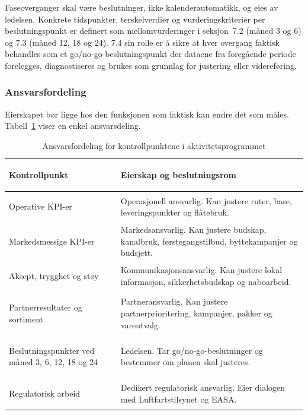 Faseoverganger skal være beslutninger, ikke kalenderautomatikk, og eies
av ledelsen. Konkrete tidspunkter, terskelverdier og vurderingskriterier
per beslutningspunkt er definert som mellomvurderinger i
seksjon~7.2 (måned 3 og 6) og 7.3 (måned 12, 18 og 24). 7.4 sin rolle er
å sikre at hver overgang faktisk behandles som et go/no-go-beslutningspunkt
der dataene fra foregående periode forelegges, diagnostiseres og brukes
som grunnlag for justering eller videreføring.

\subsubsection{Ansvarsfordeling}

Eierskapet bør ligge hos den funksjonen som faktisk kan endre det som måles.
Tabell~\ref{tab:ansvar-kontroll} viser en enkel ansvarsdeling.

\begin{table}[H]
\centering
\caption{Ansvarsfordeling for kontrollpunktene i aktivitetsprogrammet}
\label{tab:ansvar-kontroll}
\small
\renewcommand{\arraystretch}{1.15}
\begin{tabularx}{\textwidth}{@{} >{\bfseries\raggedright\arraybackslash}p{5.0cm} >{\raggedright\arraybackslash}X @{}}
\toprule
\rowcolor{tableheader}
\color{white}\textbf{Kontrollpunkt} &
\color{white}\textbf{Eierskap og beslutningsrom} \\
\midrule
Operative KPI-er &
Operasjonell ansvarlig. Kan justere ruter, base, leveringspunkter og flåtebruk. \\
\rowcolor{tablerow}
Markedsmessige KPI-er &
Markedsansvarlig. Kan justere budskap, kanalbruk, førstegangstilbud, byttekampanjer og budsjett. \\
Aksept, trygghet og støy &
Kommunikasjonsansvarlig. Kan justere lokal informasjon, sikkerhetsbudskap og naboarbeid. \\
\rowcolor{tablerow}
Partnerresultater og sortiment &
Partneransvarlig. Kan justere partnerprioritering, kampanjer, pakker og vareutvalg. \\
Beslutningspunkter ved måned 3, 6, 12, 18 og 24 &
Ledelsen. Tar go/no-go-beslutninger og bestemmer om planen skal justeres. \\
\rowcolor{tablerow}
Regulatorisk arbeid &
Dedikert regulatorisk ansvarlig. Eier dialogen med Luftfartstilsynet og EASA. \\
\bottomrule
\end{tabularx}
\end{table}
